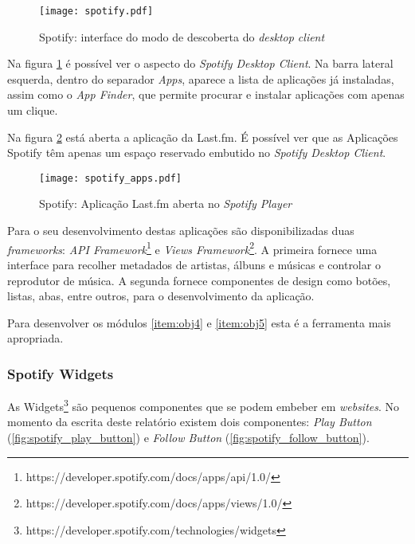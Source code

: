       \begin{figure}
        \begin{center}
          \texttt{[image: spotify.pdf]}
        \end{center}
        \caption{Spotify: interface do modo de descoberta do \emph{desktop client}}
        \label{fig:spotify_apps}
      \end{figure}

      Na figura \ref{fig:spotify_apps} é possível ver o aspecto do \emph{Spotify Desktop Client}.
      Na barra lateral esquerda, dentro do separador \emph{Apps}, aparece a lista de aplicações já instaladas, assim como o \emph{App Finder}, que permite procurar e instalar aplicações com apenas um clique.
 
      Na figura \ref{fig:spotify_apps2} está aberta a aplicação da Last.fm. É possível ver que as Aplicações Spotify têm apenas um espaço reservado embutido no \emph{Spotify Desktop Client}.

      \begin{figure}
        \begin{center}
          \texttt{[image: spotify\_apps.pdf]}
        \end{center}
        \caption{Spotify: Aplicação Last.fm aberta no \emph{Spotify Player}}
        \label{fig:spotify_apps2}
      \end{figure}

      Para o seu desenvolvimento destas aplicações são disponibilizadas duas \emph{frameworks}: \emph{API Framework}\footnote{https://developer.spotify.com/docs/apps/api/1.0/} e \emph{Views Framework}\footnote{https://developer.spotify.com/docs/apps/views/1.0/}.
      A primeira fornece uma interface para recolher metadados de artistas, álbuns e músicas e controlar o reprodutor de música.
      A segunda fornece componentes de design como botões, listas, abas, entre outros, para o desenvolvimento da aplicação.

      Para desenvolver os módulos \ref{item:obj4} e \ref{item:obj5} esta é a ferramenta mais apropriada.



    \subsubsection{Spotify Widgets} %
    \label{ssub:spotify_widgets}
      As Widgets\footnote{https://developer.spotify.com/technologies/widgets} são pequenos componentes que se podem embeber em \emph{websites}.
      No momento da escrita deste relatório existem dois componentes: \emph{Play Button} (\ref{fig:spotify_play_button}) e \emph{Follow Button} (\ref{fig:spotify_follow_button}).


